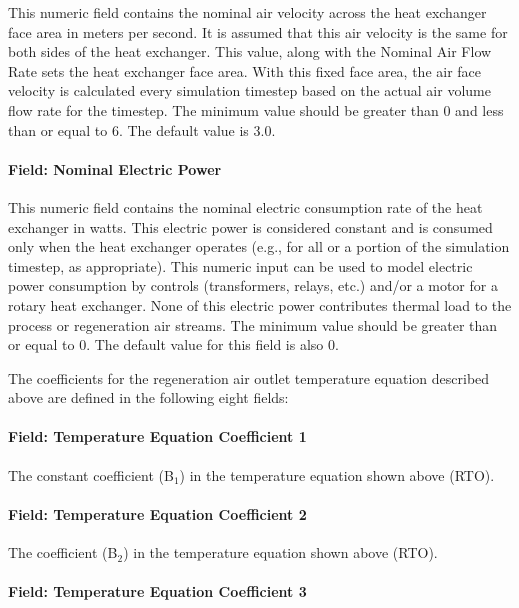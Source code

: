 This numeric field contains the nominal air velocity across the heat exchanger face area in meters per second. It is assumed that this air velocity is the same for both sides of the heat exchanger. This value, along with the Nominal Air Flow Rate sets the heat exchanger face area. With this fixed face area, the air face velocity is calculated every simulation timestep based on the actual air volume flow rate for the timestep. The minimum value should be greater than 0 and less than or equal to 6. The default value is 3.0.

\paragraph{Field: Nominal Electric Power}\label{field-nominal-electric-power-2}

This numeric field contains the nominal electric consumption rate of the heat exchanger in watts. This electric power is considered constant and is consumed only when the heat exchanger operates (e.g., for all or a portion of the simulation timestep, as appropriate). This numeric input can be used to model electric power consumption by controls (transformers, relays, etc.) and/or a motor for a rotary heat exchanger. None of this electric power contributes thermal load to the process or regeneration air streams. The minimum value should be greater than or equal to 0. The default value for this field is also 0.

The coefficients for the regeneration air outlet temperature equation described above are defined in the following eight fields:

\paragraph{Field: Temperature Equation Coefficient 1}\label{field-temperature-equation-coefficient-1}

The constant coefficient (B\(_{1}\)) in the temperature equation shown above (RTO).

\paragraph{Field: Temperature Equation Coefficient 2}\label{field-temperature-equation-coefficient-2}

The coefficient (B\(_{2}\)) in the temperature equation shown above (RTO).

\paragraph{Field: Temperature Equation Coefficient 3}\label{field-temperature-equation-coefficient-3}

